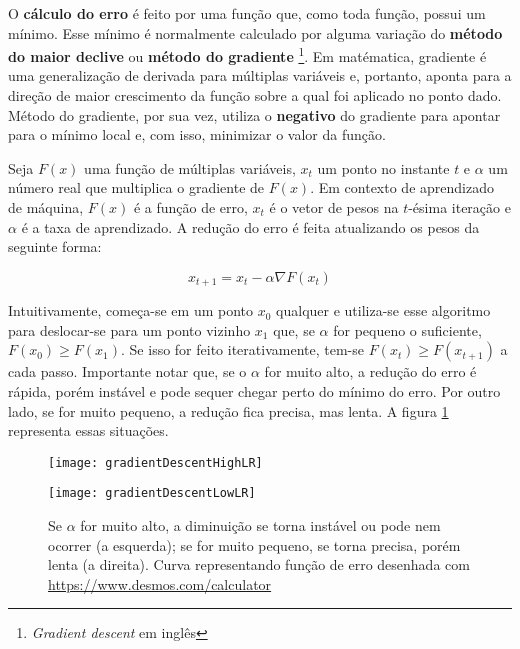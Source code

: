 O \textbf{cálculo do erro} é feito por uma função que, como toda função, possui um mínimo.
Esse mínimo é normalmente calculado por alguma variação do \textbf{método do maior declive} ou \textbf{método do gradiente} \footnote{\textit{Gradient descent} em inglês}.
Em matématica, gradiente é uma generalização de derivada para múltiplas variáveis e, portanto, aponta para a direção de maior crescimento da função sobre a qual foi aplicado no ponto dado.
Método do gradiente, por sua vez, utiliza o \textbf{negativo} do gradiente para apontar para o mínimo local e, com isso, minimizar o valor da função.

Seja $F(x)$ uma função de múltiplas variáveis, $x_{t}$ um ponto no instante $t$ e $\alpha$ um número real que multiplica o gradiente de $F(x)$.
Em contexto de aprendizado de máquina, $F(x)$ é a função de erro, $x_{t}$ é o vetor de pesos na $t$-ésima iteração e $\alpha$ é a taxa de aprendizado.
A redução do erro é feita atualizando os pesos da seguinte forma:

\begin{equation} \label{eq:w_update}
x_{t+1} = x_{t} - \alpha \nabla F(x_{t})
\end{equation}

Intuitivamente, começa-se em um ponto $x_{0}$ qualquer e utiliza-se esse algoritmo para deslocar-se para um ponto vizinho $x_{1}$ que, se $\alpha$ for pequeno o suficiente, $F(x_{0}) \geq F(x_{1})$.
Se isso for feito iterativamente, tem-se $F(x_{t}) \geq F(x_{t+1})$ a cada passo.
Importante notar que, se o $\alpha$ for muito alto, a redução do erro é rápida, porém instável e  pode sequer chegar perto do mínimo do erro.
Por outro lado, se for muito pequeno, a redução fica precisa, mas lenta.
A figura \ref{fig:gradientDescent} representa essas situações.

\begin{figure}[h!]
  \begin{minipage}[b]{.45\textwidth}
  \centering
  \texttt{[image: gradientDescentHighLR]}
  \label{fig:gdhighlr}
  \end{minipage}
  \hfill
  \begin{minipage}[b]{.45\textwidth}
  \centering
  \texttt{[image: gradientDescentLowLR]}
  \label{fig:gdlowlr}
  \end{minipage}
  \caption{Se $\alpha$ for muito alto, a diminuição se torna instável ou pode nem ocorrer (a esquerda); se for muito pequeno, se torna precisa, porém lenta (a direita). Curva representando função de erro desenhada com \url{https://www.desmos.com/calculator}}
  \label{fig:gradientDescent}
\end{figure}


